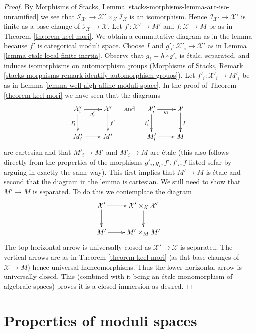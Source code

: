 \begin{proof}
By Morphisms of Stacks, Lemma \ref{stacks-morphisms-lemma-aut-iso-unramified}
we see that
$\mathcal{I}_{\mathcal{X}'} \to
\mathcal{X}' \times_\mathcal{X} \mathcal{I}_\mathcal{X}$
is an isomorphism. Hence $\mathcal{I}_{\mathcal{X}'} \to \mathcal{X}'$
is finite as a base change of $\mathcal{I}_\mathcal{X} \to \mathcal{X}$.
Let $f' : \mathcal{X}' \to M'$ and $f : \mathcal{X} \to M$ be as in
Theorem \ref{theorem-keel-mori}.
We obtain a commutative diagram as in the lemma because
$f'$ is categorical moduli space.
Choose $I$ and $g'_i : \mathcal{X}'_i \to \mathcal{X}'$ as in
Lemma \ref{lemma-etale-local-finite-inertia}.
Observe that $g_i = h \circ g'_i$
is \'etale, separated, and induces isomorphisms on
automorphism groups (Morphisms of Stacks, Remark
\ref{stacks-morphisms-remark-identify-automorphism-groups}).
Let $f'_i : \mathcal{X}'_i \to M'_i$ be as in
Lemma \ref{lemma-well-nigh-affine-moduli-space}.
In the proof of Theorem \ref{theorem-keel-mori}
we have seen that the diagrams
$$
\xymatrix{
\mathcal{X}'_i \ar[d]_{f'_i} \ar[r]_{g'_i} &
\mathcal{X}' \ar[d]^{f'} \\
M'_i \ar[r] &
M'
}
\quad\text{and}\quad
\xymatrix{
\mathcal{X}'_i \ar[d]_{f'_i} \ar[r]_{g_i} &
\mathcal{X} \ar[d]^f \\
M'_i \ar[r] &
M
}
$$
are cartesian and that $M'_i \to M'$ and $M'_i \to M$ are \'etale
(this also follows directly from the properties of the morphisms
$g'_i, g_i, f', f'_i, f$ listed sofar by arguing in exactly the same way).
This first implies that $M' \to M$ is \'etale and second that
the diagram in the lemma is cartesian. We still need to show
that $M' \to M$ is separated. To do this we contemplate the
diagram
$$
\xymatrix{
\mathcal{X}' \ar[r] \ar[d] &
\mathcal{X}' \times_\mathcal{X} \mathcal{X}' \ar[d] \\
M' \ar[r] &
M' \times_M M'
}
$$
The top horizontal arrow is universally closed as
$\mathcal{X}' \to \mathcal{X}$ is separated.
The vertical arrows are as in Theorem \ref{theorem-keel-mori}
(as flat base changes of $\mathcal{X} \to M$)
hence universal homeomorphisms. Thus the lower horizontal
arrow is universally closed. This (combined with it being an \'etale
monomorphism of algebraic spaces) proves it is a closed immersion as desired.
\end{proof}





\section{Properties of moduli spaces}
\label{section-properties-moduli-spaces}

